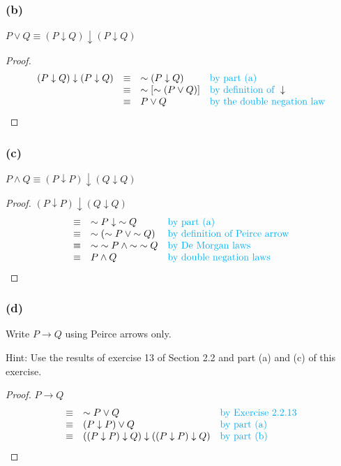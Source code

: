 \documentclass[14pt]{extarticle}
\newcommand{\da}{\downarrow}
\begin{document}
\subsubsection{(b)} 
$P \vee Q \equiv (P \da Q) \da (P \da Q)$

\begin{proof} 
$$ 
\begin{array}{rcll} 
(P \da Q) \da (P \da Q) & \equiv & {\sim (P \da Q)} & \text{\color{cyan}by part (a)} \\
& \equiv & {\sim[{\sim (P \vee Q)}]} & \text{\color{cyan}by definition of } \da \\ 
& \equiv & P \vee Q & \text{\color{cyan}by the double negation law} \\ 
\end{array} 
$$ 
\end{proof}

\subsubsection{(c)} 
$P \wedge Q \equiv (P \da P) \da (Q \da Q)$

\begin{proof} 
$(P \da P) \da (Q \da Q)$ 
$$ 
\begin{array}{cll} 
\equiv & {\sim P} \da {\sim Q} & \text{\color{cyan}by part (a)} \\ 
\equiv & {\sim ({\sim P} \vee {\sim Q})} & \text{\color{cyan}by definition of Peirce arrow} \\ 
\equiv & {\sim {\sim P}} \wedge {\sim {\sim Q}} & \text{\color{cyan}by De Morgan laws} \\
\equiv & P \wedge Q & \text{\color{cyan}by double negation laws} \\ 
\end{array}
$$ 
\end{proof}

\subsubsection{(d)} 
Write $P \to Q$ using Peirce arrows only.

Hint: Use the results of exercise 13 of Section 2.2 and part (a) and (c) of this exercise.

\begin{proof} 
$P \to Q$ 
$$ 
\begin{array}{cll} 
\equiv & {\sim P} \vee Q & \text{\color{cyan}by Exercise 2.2.13} \\ 
\equiv & (P \da P) \vee Q & \text{\color{cyan}by part (a)} \\ \equiv & ((P \da P) \da Q) \da ((P \da P) \da Q) & \text{\color{cyan}by part (b)} \\ 
\end{array} 
$$ 
\end{proof}
\end{document}
